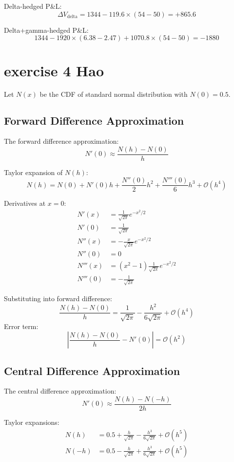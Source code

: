 \documentclass{article}
\begin{document}
Delta-hedged P\&L:
\[
\Delta V_{\text{delta}} = 1344 - 119.6 \times (54 - 50) = +865.6
\]

Delta+gamma-hedged P\&L:
\[
1344 - 1920\times(6.38-2.47) + 1070.8\times (54 - 50) = -1880
\]


\section{exercise 4 Hao}

Let $N(x)$ be the CDF of standard normal distribution with $N(0)=0.5$.

\subsection*{Forward Difference Approximation}
The forward difference approximation:
\[
N'(0) \approx \frac{N(h)-N(0)}{h}
\]

Taylor expansion of $N(h)$:
\[
N(h) = N(0) + N'(0)h + \frac{N''(0)}{2}h^2 + \frac{N'''(0)}{6}h^3 + \mathcal{O}(h^4)
\]

Derivatives at $x=0$:
\begin{align*}
N'(x) &= \frac{1}{\sqrt{2\pi}}e^{-x^2/2} \\
N'(0) &= \frac{1}{\sqrt{2\pi}} \\
N''(x) &= -\frac{x}{\sqrt{2\pi}}e^{-x^2/2} \\
N''(0) &= 0 \\
N'''(x) &= (x^2-1)\frac{1}{\sqrt{2\pi}}e^{-x^2/2} \\
N'''(0) &= -\frac{1}{\sqrt{2\pi}}
\end{align*}

Substituting into forward difference:
\[
\frac{N(h)-N(0)}{h} = \frac{1}{\sqrt{2\pi}} - \frac{h^2}{6\sqrt{2\pi}} + \mathcal{O}(h^4)
\]
Error term:
\[
\left|\frac{N(h)-N(0)}{h}-N'(0)\right| = \mathcal{O}(h^2)
\]

\subsection*{Central Difference Approximation}
The central difference approximation:
\[
N'(0) \approx \frac{N(h)-N(-h)}{2h}
\]

Taylor expansions:
\begin{align*}
N(h) &= 0.5 + \frac{h}{\sqrt{2\pi}} - \frac{h^3}{6\sqrt{2\pi}} + \mathcal{O}(h^5) \\
N(-h) &= 0.5 - \frac{h}{\sqrt{2\pi}} + \frac{h^3}{6\sqrt{2\pi}} + \mathcal{O}(h^5)
\end{align*}
\end{document}
